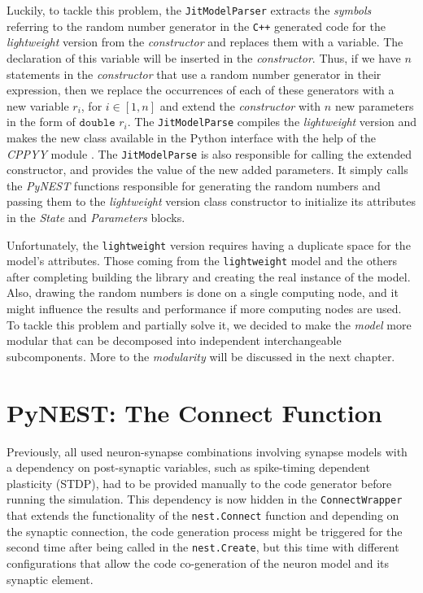 Luckily, to tackle this problem, the \texttt{JitModelParser} extracts the \emph{symbols} referring to the random number generator in the \texttt{C++} generated code for the \emph{lightweight} version from the \emph{constructor} and replaces them with a variable. The declaration of this variable will be inserted in the \emph{constructor}. Thus, if we have $n$ statements in the \emph{constructor} that use a random number generator in their expression, then we replace the occurrences of each of these generators with a new variable $r_i$, for $i \in [1, n]$ and extend the \emph{constructor} with $n$ new parameters in the form of $\texttt{double } r_i$. The \texttt{JitModelParse} compiles the \emph{lightweight} version and makes the new class available in the Python interface with the help of the \emph{CPPYY} module \citep{cppyy}. The \texttt{JitModelParse} is also responsible for calling the extended constructor, and provides the value of the new added parameters. It simply calls the \emph{PyNEST} functions responsible for generating the random numbers and passing them to the \emph{lightweight} version class constructor to initialize its attributes in the \emph{State} and \emph{Parameters} blocks.

Unfortunately, the \texttt{lightweight} version requires having a duplicate space for the model's attributes. Those coming from the \texttt{lightweight} model  and the others after completing building the library and creating the real instance of the model. Also, drawing the random numbers is done on a single computing node, and it might influence the results and performance if more computing nodes are used. To tackle this problem and partially solve it, we decided to make the \emph{model} more modular that can be decomposed into independent interchangeable subcomponents. More to the \emph{modularity} will be discussed in the next chapter.

\section{PyNEST: The Connect Function}

Previously, all used neuron-synapse combinations involving synapse models with a dependency on post-synaptic variables, such as spike-timing dependent plasticity (STDP), had to be provided manually to the code generator before running the simulation.  This dependency is now hidden in the \texttt{ConnectWrapper} that extends the functionality of the \texttt{nest.Connect} function and depending on the synaptic connection, the code generation process might be triggered  for the second time after being called in the \texttt{nest.Create}, but this time with different  configurations that allow the code co-generation of the neuron model and its synaptic element.

